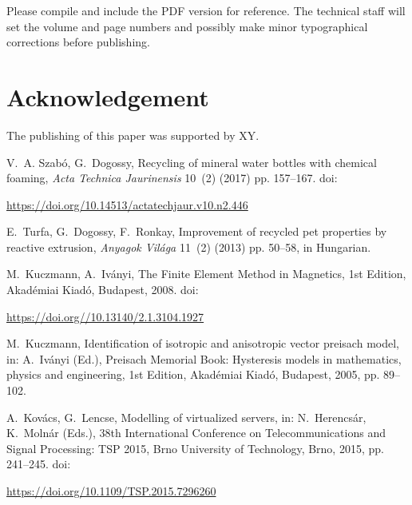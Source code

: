 \documentclass[10pt,a5paper]{article}
\begin{document}
Please compile and include the PDF version for reference. The technical staff 
will set the volume and page numbers and possibly make minor typographical 
corrections before publishing.


\section*{Acknowledgement}
The publishing of this paper was supported by XY.


\begin{thebibliography}{1}

V.~A. Szabó, G.~Dogossy, Recycling of mineral water bottles with chemical
  foaming,  \textit{Acta Technica Jaurinensis} 10~(2) (2017) pp. 157--167.
	\newline doi: \begin{footnotesize}\url{https://doi.org/10.14513/actatechjaur.v10.n2.446}\end{footnotesize}

E.~Turfa, G.~Dogossy, F.~Ronkay, Improvement of recycled pet properties by
  reactive extrusion,  \textit{Anyagok Világa} 11~(2) (2013) pp. 50--58, in Hungarian.

M.~Kuczmann, A.~Iványi, The Finite Element Method in Magnetics, 1st Edition,
  Akadémiai Kiadó, Budapest, 2008.
	\newline doi: \begin{footnotesize}\url{https://doi.org//10.13140/2.1.3104.1927}\end{footnotesize}

M.~Kuczmann, Identification of isotropic and anisotropic vector preisach model,
  in: A.~Iványi (Ed.), Preisach Memorial Book: Hysteresis models in
  mathematics, physics and engineering, 1st Edition, Akadémiai Kiadó,
  Budapest, 2005, pp. 89--102.

A.~Kovács, G.~Lencse, Modelling of virtualized servers, in: N.~Herencsár,
  K.~Molnár (Eds.), 38th International Conference on Telecommunications and
  Signal Processing: TSP 2015, Brno University of Technology, Brno, 2015, pp.
  241--245.
	\newline doi: \begin{footnotesize}\url{https://doi.org/10.1109/TSP.2015.7296260}\end{footnotesize}


\end{thebibliography}
\end{document}
